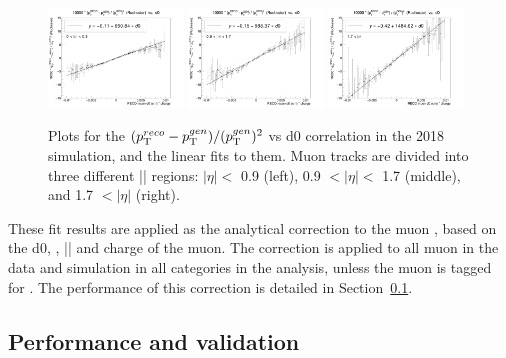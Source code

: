 \begin{figure}[!htb]
      \centering
      \captionsetup{justification=justified}
      \includegraphics[width=0.32\textwidth]{pics/muon_corr/GeoFit/fit_results/2018_DY_eta_0_0p9_dRelPt2p0_Roch.png}
      \includegraphics[width=0.32\textwidth]{pics/muon_corr/GeoFit/fit_results/2018_DY_eta_0p9_1p7_dRelPt2p0_Roch.png}
      \includegraphics[width=0.32\textwidth]{pics/muon_corr/GeoFit/fit_results/2018_DY_eta_1p7_inf_dRelPt2p0_Roch.png}
      \caption{Plots for the $(p_{\mathrm{T}}^{reco}-p_{\mathrm{T}}^{gen})/ (p_{\mathrm{T}}^{gen})^{2}$ vs d0 correlation in the 2018 \DY simulation, 
               and the linear fits to them. Muon tracks are divided into three different |\eta| regions:
               $|\eta| <$ 0.9 (left), 0.9 $< |\eta| <$ 1.7 (middle), and 1.7 $< |\eta|$ (right).
               }
      \label{fig:geofit_param_2018}
\end{figure}

These fit results are applied as the analytical correction to the muon \pt, 
based on the d0, \pt, |\eta| and charge of the muon.
The correction is applied to all muon in the data and simulation in all categories in the \hmm analysis, 
unless the muon is tagged for \FSR.
The performance of this correction is detailed in Section~\ref{sec:perf_geofit}.

\subsection{Performance and validation}\label{sec:perf_geofit}

